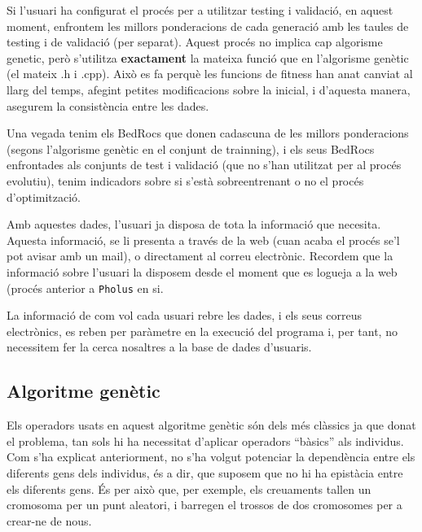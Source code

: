 \documentclass[titlepage,a4paper,12pt]{book}
\begin{document}
Si l'usuari ha configurat el procés per a utilitzar testing i validació, en
aquest moment, enfrontem les millors ponderacions de cada generació amb les
taules de testing i de validació (per separat).  Aquest procés no implica cap
algorisme genetic, però s'utilitza \textbf{exactament} la mateixa funció que en
l'algorisme genètic (el mateix .h i .cpp).  Això es fa perquè les funcions de
fitness han anat canviat al llarg del temps, afegint petites modificacions sobre
la inicial, i d'aquesta manera, asegurem la consistència entre les dades.

Una vegada tenim els BedRocs que donen cadascuna de les millors ponderacions
(segons l'algorisme genètic en el conjunt de trainning), i els seus BedRocs
enfrontades als conjunts de test i validació (que no s'han utilitzat per al
procés evolutiu), tenim indicadors sobre si s'està sobreentrenant o no el procés
d'optimització.

Amb aquestes dades, l'usuari ja disposa de tota la informació que necesita.
Aquesta informació, se li presenta a través de la web (cuan acaba el procés se'l
pot avisar amb un mail), o directament al correu electrònic.  Recordem que la
informació sobre l'usuari la disposem desde el moment que es logueja a la web
(procés anterior a \texttt{Pholus} en si.

La informació de com vol cada usuari rebre les dades, i els seus correus
electrònics, es reben per paràmetre en la execució del programa i, per tant, no
necessitem fer la cerca nosaltres a la base de dades d'usuaris.



\subsection{Algoritme genètic} %
\label{sub:Algoritme genetic}

Els operadors usats en aquest algoritme genètic són dels més clàssics ja que
donat el problema, tan sols hi ha necessitat d'aplicar operadors ``bàsics'' als
individus.  Com s'ha explicat anteriorment, no s'ha volgut potenciar la
dependència entre els diferents gens dels individus, és a dir, que suposem que
no hi ha epistàcia entre els diferents gens.  És per això que, per exemple, els
creuaments tallen un cromosoma per un punt aleatori, i barregen el trossos de
dos cromosomes per a crear-ne de nous.
\end{document}
